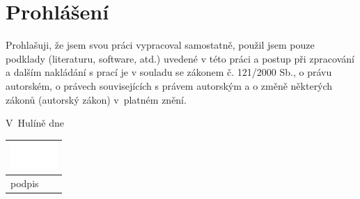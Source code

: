 \vfill

\vglue 13cm

\section*{Prohlášení}

\begin{spacing}{1.3}
	 Prohlašuji, že jsem svou práci vypracoval samostatně, použil jsem pouze podklady (literaturu, software, atd.) uvedené v této práci a postup při zpracování a dalším nakládání s prací je v souladu se zákonem č. 121/2000 Sb., o právu autorském, o právech souvisejících s právem autorským a o změně některých zákonů (autorský zákon) v~platném znění. 
\end{spacing}

\vspace{1.5cm}

V~Hulíně dne \Podepsano

\begin{flushright}
	\vspace{-1.5cm}
	\begin{tabular}{p{3.5cm}}
		\hspace{0.8cm}\includegraphics[height=1cm]{00-Hlavicka/podpis.png}
		\\
		\hline
		\hspace{1cm} podpis
	\end{tabular}
	\hspace*{0.5cm}
\end{flushright}
